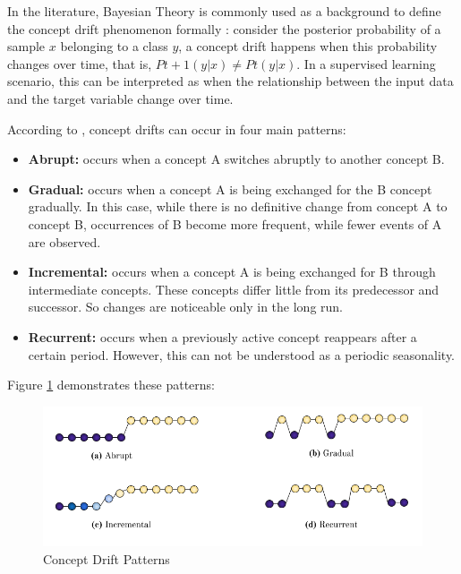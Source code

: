 \documentclass[preprint,12pt]{elsarticle}
\begin{document}
In the literature, Bayesian Theory is commonly used as a background to define the concept drift phenomenon formally \cite{Elwell:2011}: consider the posterior probability of a sample $x$ belonging to a class $y$, a concept drift happens when this probability changes over time, that is, $Pt + 1 (y | x) \neq Pt (y | x)$. In a supervised learning scenario, this can be interpreted as when the relationship between the input data and the target variable change over time.

According to \cite{tsymbal2004problem, Gama:2014:DAF:2670967.2670971}, concept drifts can occur in four main patterns:

\begin{itemize}
    \item \textbf{Abrupt:} occurs when a concept A switches abruptly to another concept B.
    \item \textbf{Gradual:} occurs when a concept A is being exchanged for the B concept gradually. In this case, while there is no definitive change from concept A to concept B, occurrences of B become more frequent, while fewer events of A are observed.
    \item \textbf{Incremental:} occurs when a concept A is being exchanged for B through intermediate concepts.  These concepts differ little from its predecessor and successor. So changes are noticeable only in the long run.
    \item \textbf{Recurrent:} occurs when a previously active concept reappears after a certain period. However, this can not be understood as a periodic seasonality.
\end{itemize}

Figure \ref{fig:concept_drift_patterns} demonstrates these patterns:

\begin{figure}[h!]
\begin{center}
    \includegraphics[scale=0.65]{img/concept_drift_patterns.png}
    \caption{Concept Drift Patterns}
    \label{fig:concept_drift_patterns}
\end{center}
\end{figure}
\end{document}
